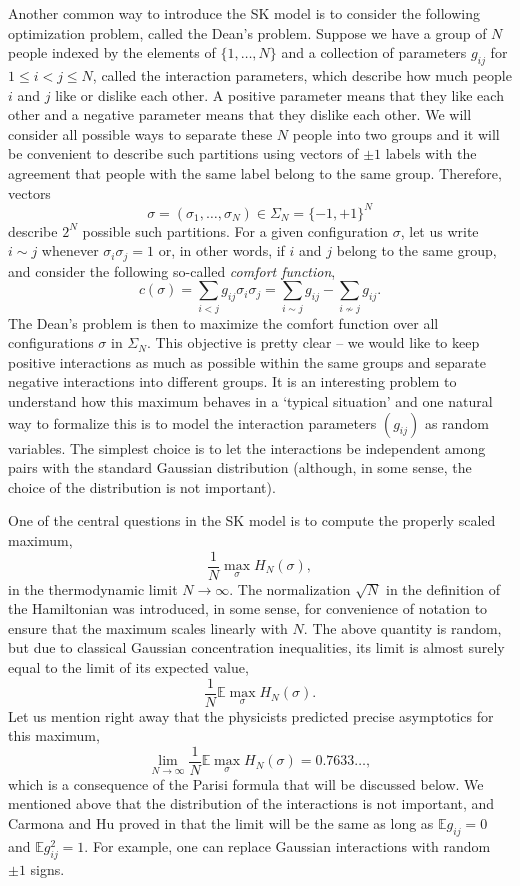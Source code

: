 \documentclass[12pt]{article}
\newcommand{\e}{\mathbb{E}}
\theoremstyle{nonumberplain}
\begin{document}
Another common way to introduce the SK model is to consider the following optimization problem, called the Dean's problem. Suppose we have a group of $N$ people indexed by the elements of $\{1,\ldots, N\}$ and a collection of parameters $g_{ij}$ for $1\leq i < j \leq N$, called the interaction parameters, which describe how much people $i$ and $j$ like or dislike each other. A positive parameter means that they like each other and a negative parameter means that they dislike each other. We will consider all possible ways to separate these $N$ people into two groups and it will be convenient to describe such partitions using vectors of $\pm 1$ labels with the agreement that people with the same label belong to the same group. Therefore, vectors 
$$
\sigma = (\sigma_1,\ldots,\sigma_N) \in \Sigma_N = \{-1,+1\}^N
$$
describe $2^N$ possible such partitions. For a given configuration $\sigma$, let us write $i\sim j$ whenever $\sigma_i \sigma_j=1$ or, in other words, if $i$ and $j$ belong to the same group, and consider the following so-called \emph{comfort function},
\begin{equation}
c(\sigma) = \sum_{i<j} g_{ij} \sigma_i \sigma_j 
=
\sum_{i\sim j} g_{ij} - \sum_{i\not \sim j} g_{ij}.
\label{ch11DeanComfort}
\end{equation}
The Dean's problem is then to maximize the comfort function over all configurations $\sigma$ in $\Sigma_N$. This objective is pretty clear -- we would like to keep positive interactions as much as possible within the same groups and separate negative interactions into different groups. It is an interesting problem to understand how this maximum behaves in a `typical situation' and one natural way to formalize this is to model the interaction parameters $(g_{ij})$ as random variables. The simplest choice is to let the interactions be independent among pairs with the standard Gaussian distribution (although, in some sense, the choice of the distribution is not important). 

One of the central questions in the SK model is to compute the properly scaled maximum, 
$$
\frac{1}{N}\max_{\sigma} H_N(\sigma),
$$ 
in the thermodynamic limit $N\to\infty$.  The normalization $\sqrt{N}$ in the definition of the Hamiltonian was introduced, in some sense, for convenience of notation to ensure that the maximum scales linearly with $N$. The above quantity is random, but due to classical Gaussian concentration inequalities, its limit is almost surely equal to the limit of its expected value,
\begin{equation}
\frac{1}{N}\e \max_{\sigma} H_N(\sigma).
\label{ch11limmax}
\end{equation}
Let us mention right away that the physicists predicted precise asymptotics for this maximum,
$$
\lim_{N\to\infty} \frac{1}{N}\e \max_{\sigma} H_N(\sigma) = 0.7633\ldots,
$$
which is a consequence of the Parisi formula that will be discussed below. We mentioned above that the distribution of the interactions is not important, and Carmona and Hu proved in \cite{CarmonaHu} that the limit will be the same as long as $\e g_{ij} = 0$ and $\e g_{ij}^2 = 1$. For example, one can replace Gaussian interactions with random $\pm 1$ signs.
\end{document}
